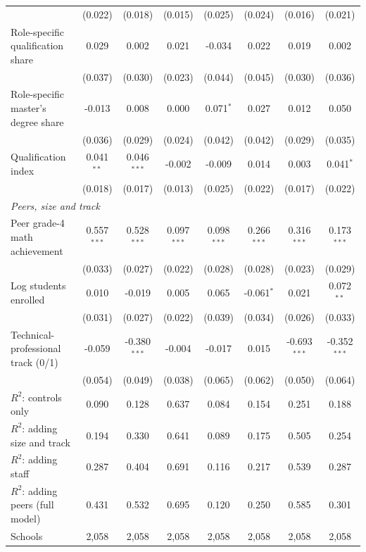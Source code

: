 \begin{table}[!htbp]
{\begin{tabular}{lccccccc}
 & (0.022) & (0.018) & (0.015) & (0.025) & (0.024) & (0.016) & (0.021) \\
\quad Role-specific qualification share & 0.029 & 0.002 & 0.021 & -0.034 & 0.022 & 0.019 & 0.002 \\
 & (0.037) & (0.030) & (0.023) & (0.044) & (0.045) & (0.030) & (0.036) \\
\quad Role-specific master's degree share & -0.013 & 0.008 & 0.000 & 0.071$^{*}$ & 0.027 & 0.012 & 0.050 \\
 & (0.036) & (0.029) & (0.024) & (0.042) & (0.042) & (0.029) & (0.035) \\
\quad Qualification index & 0.041$^{**}$ & 0.046$^{***}$ & -0.002 & -0.009 & 0.014 & 0.003 & 0.041$^{*}$ \\
 & (0.018) & (0.017) & (0.013) & (0.025) & (0.022) & (0.017) & (0.022) \\
\multicolumn{8}{l}{\textit{Peers, size and track}} \\
\quad Peer grade-4 math achievement & 0.557$^{***}$ & 0.528$^{***}$ & 0.097$^{***}$ & 0.098$^{***}$ & 0.266$^{***}$ & 0.316$^{***}$ & 0.173$^{***}$ \\
 & (0.033) & (0.027) & (0.022) & (0.028) & (0.028) & (0.023) & (0.029) \\
\quad Log students enrolled & 0.010 & -0.019 & 0.005 & 0.065 & -0.061$^{*}$ & 0.021 & 0.072$^{**}$ \\
 & (0.031) & (0.027) & (0.022) & (0.039) & (0.034) & (0.026) & (0.033) \\
\quad Technical-professional track (0/1) & -0.059 & -0.380$^{***}$ & -0.004 & -0.017 & 0.015 & -0.693$^{***}$ & -0.352$^{***}$ \\
 & (0.054) & (0.049) & (0.038) & (0.065) & (0.062) & (0.050) & (0.064) \\
\midrule
$R^2$: controls only & 0.090 & 0.128 & 0.637 & 0.084 & 0.154 & 0.251 & 0.188 \\
$R^2$: adding size and track & 0.194 & 0.330 & 0.641 & 0.089 & 0.175 & 0.505 & 0.254 \\
$R^2$: adding staff & 0.287 & 0.404 & 0.691 & 0.116 & 0.217 & 0.539 & 0.287 \\
$R^2$: adding peers (full model) & 0.431 & 0.532 & 0.695 & 0.120 & 0.250 & 0.585 & 0.301 \\
Schools & 2,058 & 2,058 & 2,058 & 2,058 & 2,058 & 2,058 & 2,058 \\
\bottomrule
\end{tabular}}
\par\medskip
\footnotesize
\begin{minipage}{\textwidth}

\end{minipage}
\end{table}
